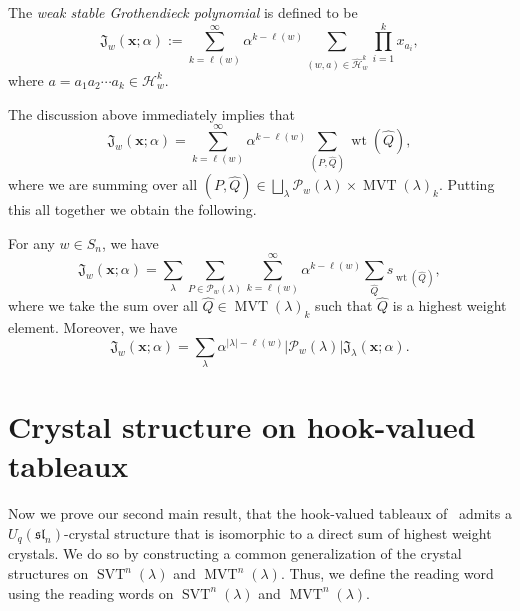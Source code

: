 \documentclass[ALCO,ThmDefs,Unicode,epreuves]{cedram}
\newcommand{\wG}{\mathfrak{J}}  %
\newcommand{\xx}{\mathbf{x}}
\newcommand{\HH}{\mathcal{H}}
\newcommand{\abs}[1]{\lvert #1 \rvert}
\newcommand{\fsl}{\mathfrak{sl}}
\newcommand{\sym}{S}
\DeclareMathOperator{\wt}{wt} %
\DeclareMathOperator{\svt}{SVT} %
\DeclareMathOperator{\mvt}{MVT} %
\newcommand{\mcP}{\mathcal{P}}
\newcommand{\defn}[1]{{\color{darkred}\emph{#1}}} %
\begin{document}
\begin{defi}
The \defn{weak stable Grothendieck polynomial} is defined to be
\begin{equation*}
\wG_w(\xx; \alpha) := \sum_{k=\ell(w)}^{\infty} \alpha^{k-\ell(w)} \sum_{(w,a) \in \widehat{\HH}_w^k} \prod_{i=1}^k x_{a_i},
\end{equation*}
where $a = a_1 a_2 \dotsm a_k \in \HH_w^k$.
\end{defi}

The discussion above immediately implies that
\begin{equation*}
\wG_w(\xx; \alpha) = \sum_{k=\ell(w)}^{\infty} \alpha^{k-\ell(w)} \sum_{(P,\widehat{Q})} \wt(\widehat{Q}),
\end{equation*}
where we are summing over all $(P,\widehat{Q}) \in \bigsqcup_{\lambda} \mcP_w(\lambda) \times \mvt(\lambda)_k$. 
Putting this all together we obtain the following.

\begin{prop}
For any $w \in \sym_n$, we have
\begin{equation*}
\wG_w(\xx; \alpha) = \sum_{\lambda} \sum_{P \in \mcP_w(\lambda)} \sum_{k=\ell(w)}^{\infty} \alpha^{k-\ell(w)} \sum_{\widehat{Q}} s_{\wt(\widehat{Q})},
\end{equation*}
where we take the sum over all $\widehat{Q} \in \mvt(\lambda)_k$ such that $\widehat{Q}$ is a highest weight element.
Moreover, we have
\[
\wG_w(\xx; \alpha) = \sum_{\lambda} \alpha^{\abs{\lambda}-\ell(w)} \abs{\mcP_w(\lambda)} \wG_{\lambda}(\xx; \alpha).
\]
\end{prop}









\section{Crystal structure on hook-valued tableaux}
\label{sec:hooks}

Now we prove our second main result, that the hook-valued tableaux of~\cite{Yel17} admits a $U_q(\fsl_n)$-crystal structure that is isomorphic to a direct sum of highest weight crystals.
We do so by constructing a common generalization of the crystal structures on $\svt^n(\lambda)$ and $\mvt^n(\lambda)$.
Thus, we define the reading word using the reading words on $\svt^n(\lambda)$ and $\mvt^n(\lambda)$.
\end{document}
